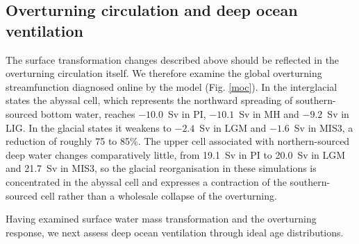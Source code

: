 \documentclass[pdflatex,sn-nature]{sn-jnl}
\begin{document}

\subsection{Overturning circulation and deep ocean ventilation}

The surface transformation changes described above should be reflected in the overturning circulation itself. We therefore examine the global overturning streamfunction diagnosed online by the model (Fig. \ref{moc}). In the interglacial states the abyssal cell, which represents the northward spreading of southern-sourced bottom water, reaches $-10.0$~Sv in PI, $-10.1$~Sv in MH and $-9.2$~Sv in LIG. In the glacial states it weakens to $-2.4$~Sv in LGM and $-1.6$~Sv in MIS3, a reduction of roughly 75 to 85\%. The upper cell associated with northern-sourced deep water changes comparatively little, from 19.1~Sv in PI to 20.0~Sv in LGM and 21.7~Sv in MIS3, so the glacial reorganisation in these simulations is concentrated in the abyssal cell and expresses a contraction of the southern-sourced cell rather than a wholesale collapse of the overturning.

Having examined surface water mass transformation and the overturning response, we next assess deep ocean ventilation through ideal age distributions.
\end{document}
